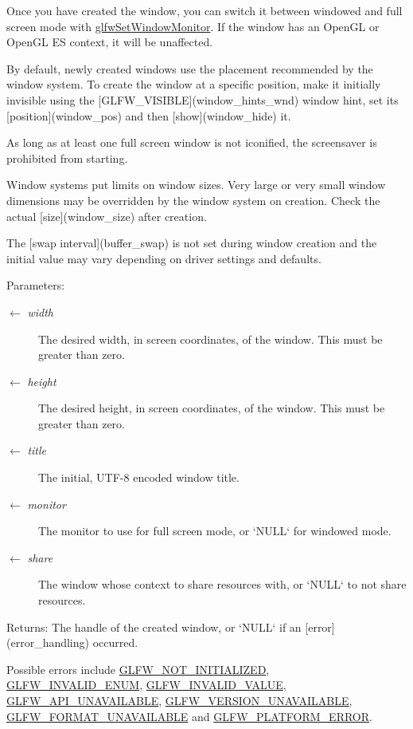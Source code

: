 Once you have created the window, you can switch it between windowed and full screen mode with \hyperlink{group__window_g12fabf78575e59c00f822f323ae0b6ae}{glfwSetWindowMonitor}. If the window has an OpenGL or OpenGL ES context, it will be unaffected.

By default, newly created windows use the placement recommended by the window system. To create the window at a specific position, make it initially invisible using the \mbox{[}GLFW\_\-VISIBLE\mbox{]}(window\_\-hints\_\-wnd) window hint, set its \mbox{[}position\mbox{]}(window\_\-pos) and then \mbox{[}show\mbox{]}(window\_\-hide) it.

As long as at least one full screen window is not iconified, the screensaver is prohibited from starting.

Window systems put limits on window sizes. Very large or very small window dimensions may be overridden by the window system on creation. Check the actual \mbox{[}size\mbox{]}(window\_\-size) after creation.

The \mbox{[}swap interval\mbox{]}(buffer\_\-swap) is not set during window creation and the initial value may vary depending on driver settings and defaults.

\begin{Desc}
\item[Parameters:]
\begin{description}
\item[\mbox{$\leftarrow$} {\em width}]The desired width, in screen coordinates, of the window. This must be greater than zero. \item[\mbox{$\leftarrow$} {\em height}]The desired height, in screen coordinates, of the window. This must be greater than zero. \item[\mbox{$\leftarrow$} {\em title}]The initial, UTF-8 encoded window title. \item[\mbox{$\leftarrow$} {\em monitor}]The monitor to use for full screen mode, or `NULL` for windowed mode. \item[\mbox{$\leftarrow$} {\em share}]The window whose context to share resources with, or `NULL` to not share resources. \end{description}
\end{Desc}
\begin{Desc}
\item[Returns:]The handle of the created window, or `NULL` if an \mbox{[}error\mbox{]}(error\_\-handling) occurred.\end{Desc}
Possible errors include \hyperlink{group__errors_g2374ee02c177f12e1fa76ff3ed15e14a}{GLFW\_\-NOT\_\-INITIALIZED}, \hyperlink{group__errors_g76f6bb9c4eea73db675f096b404593ce}{GLFW\_\-INVALID\_\-ENUM}, \hyperlink{group__errors_gaf2ef9aa8202c2b82ac2d921e554c687}{GLFW\_\-INVALID\_\-VALUE}, \hyperlink{group__errors_g56882b290db23261cc6c053c40c2d08e}{GLFW\_\-API\_\-UNAVAILABLE}, \hyperlink{group__errors_gd16c5565b4a69f9c2a9ac2c0dbc89462}{GLFW\_\-VERSION\_\-UNAVAILABLE}, \hyperlink{group__errors_g196e125ef261d94184e2b55c05762f14}{GLFW\_\-FORMAT\_\-UNAVAILABLE} and \hyperlink{group__errors_gd44162d78100ea5e87cdd38426b8c7a1}{GLFW\_\-PLATFORM\_\-ERROR}.


